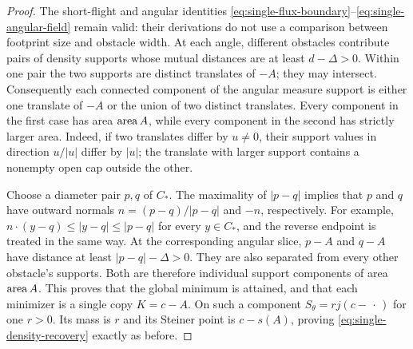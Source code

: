 \begin{proof}
The short-flight and angular identities
\eqref{eq:single-flux-boundary}--\eqref{eq:single-angular-field}
remain valid: their derivations do not use a comparison between
footprint size and obstacle width.  At each angle, different
obstacles contribute pairs of density supports whose mutual
distances are at least $d-\Delta>0$.  Within one pair the two
supports are distinct translates of $-A$; they may intersect.
Consequently each connected component of the angular measure
support is either one translate of $-A$ or the union of two
distinct translates.  Every component in the first case has area
$\operatorname{area} A$, while every component in the second has strictly larger
area.  Indeed, if two translates differ by $u\ne0$, their support
values in direction $u/|u|$ differ by $|u|$; the translate with
larger support contains a nonempty open cap outside the other.

Choose a diameter pair $p,q$ of $C_*$.  The maximality of
$|p-q|$ implies that $p$ and $q$ have outward normals
$n=(p-q)/|p-q|$ and $-n$, respectively.  For example,
$n\cdot(y-q)\le|y-q|\le|p-q|$ for every $y\in C_*$,
and the reverse endpoint is treated in the same way.
At the corresponding angular slice, $p-A$ and $q-A$ have
distance at least $|p-q|-\Delta>0$.  They are also separated
from every other obstacle's supports.  Both are therefore
individual support components of area $\operatorname{area} A$.
This proves that the global minimum is attained, and that each
minimizer is a single copy $K=c-A$.  On such a component
$S_\theta=rj(c-\,\cdot\,)$ for one $r>0$.
Its mass is $r$ and its Steiner point is $c-s(A)$, proving
\eqref{eq:single-density-recovery} exactly as before.


\end{proof}
